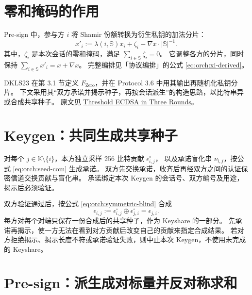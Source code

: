 
\section{零和掩码的作用}

Pre-sign 中，参与方 $i$ 将 Shamir 份额转换为衍生私钥的加法分片：
\begin{equation}
  x'_i:=\lambda(i,\mathbb{S})x_i+\zeta_i+\nabla x\cdot|\mathbb{S}|^{-1}.
\end{equation}
其中，$\zeta_i$ 是本次会话的零和掩码，满足 $\sum_{i\in\mathbb{S}}\zeta_i=0$。
它调整各方的分片，同时保持 $\sum_{i\in\mathbb{S}}x'_i=x+\nabla x$。
完整编排见「协议编排」的公式 \eqref{eq:orch:xi-derived}。

DKLS23 在第 3.1 节定义 $F_{\mathrm{Zero}}$，并在 Protocol 3.6 中用其输出再随机化私钥分片。
下文采用其“双方承诺并揭示种子，再按会话派生”的构造思路，以比特串异或合成共享种子。
原文见 \href{https://eprint.iacr.org/2023/765.pdf}{Threshold ECDSA in Three Rounds}。

\section{Keygen：共同生成共享种子}

对每个 $j\in\mathbb{K}\setminus\{i\}$，本方独立采样 256 比特贡献 $\epsilon^\circ_{i,j}$，
以及承诺盲化串 $\nu_{i,j}$，按公式 \eqref{eq:orch:seed-com} 生成承诺。
双方先交换承诺，收齐后再经双方之间的认证保密信道交换贡献与盲化串。
承诺绑定本次 Keygen 的会话号、双方编号及用途，揭示后必须验证。

双方验证通过后，按公式 \eqref{eq:orch:symmetric-blind} 合成
\begin{equation}
  \epsilon_{i,j}:=\epsilon^\circ_{i,j}\oplus\epsilon^\circ_{j,i}=\epsilon_{j,i}.
\end{equation}
每方对每个对端只保存一份合成后的共享种子，作为 Keyshare 的一部分。
先承诺再揭示，使一方无法在看到对方贡献后改变自己的贡献来指定合成结果。
若对方拒绝揭示、揭示长度不符或承诺验证失败，则中止本次 Keygen，不使用未完成的 Keyshare。

\section{Pre-sign：派生成对标量并反对称求和}

